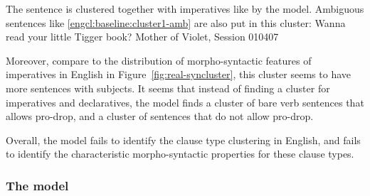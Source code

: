 The sentence is clustered together with imperatives like  by the model. Ambiguous sentences like \ref{engcl:baseline:cluster1-amb} are also put in this cluster:
Wanna read your little Tigger book? \hfill Mother of Violet, Session 010407
\eex

Moreover, compare to the distribution of morpho-syntactic features of imperatives in English in Figure~\ref{fig:real-syncluster}, this cluster seems to have more sentences with subjects. It seems that instead of finding a cluster for imperatives and declaratives, the model finds a cluster of bare verb sentences that allows pro-drop, and a cluster of sentences that do not allow pro-drop. 

Overall, the \dlearnerabbr{} model fails to identify the clause type clustering in English, and fails to identify the characteristic morpho-syntactic properties for these clause types. 


\subsubsection{The \plearnerabbr{} model}
\label{sec:engcl:model:results:p}

